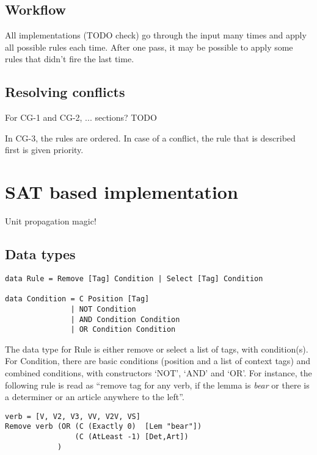 \documentclass[a4paper, 11pt]{article}
\begin{document}
\subsection{Workflow}

All implementations (TODO check) go through the input many times and apply all possible rules each time. 
After one pass, it may be possible to apply some rules that didn't fire the last time.


\subsection{Resolving conflicts}

For CG-1 and CG-2, ... sections? TODO

In CG-3, the rules are ordered. In case of a conflict, the rule that is described first is given priority.


\section{SAT based implementation}

Unit propagation magic!

\subsection{Data types}

 \begin{lstlisting}
data Rule = Remove [Tag] Condition | Select [Tag] Condition

data Condition = C Position [Tag]
               | NOT Condition
               | AND Condition Condition
               | OR Condition Condition 
\end{lstlisting}

The data type for Rule is either remove or select a list of tags, with condition(s).
For Condition, there are basic conditions (position and a list of context tags) and combined conditions, with constructors `NOT', `AND' and `OR'. For instance, the following rule is read as ``remove tag for any verb, if the lemma is \emph{bear} or there is a determiner or an article anywhere to the left''.

\begin{lstlisting}
verb = [V, V2, V3, VV, V2V, VS]
Remove verb (OR (C (Exactly 0)  [Lem "bear"])
                (C (AtLeast -1) [Det,Art])
            )
\end{lstlisting}
\end{document}
